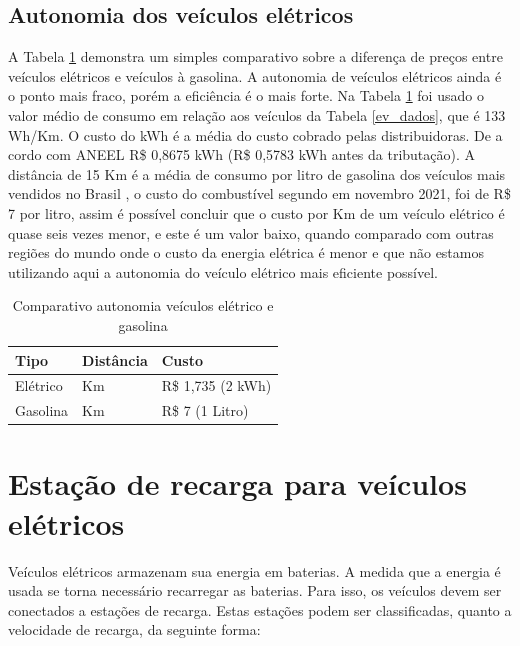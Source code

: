 \subsection{Autonomia dos veículos elétricos} \label{media_ev}

A Tabela \ref{ev_gas} demonstra um simples comparativo sobre a diferença de preços entre veículos elétricos e veículos à gasolina. A autonomia de veículos elétricos ainda é o ponto mais fraco, porém a eficiência é o mais forte. Na Tabela \ref{ev_gas} foi usado o valor médio de consumo em relação aos veículos da Tabela \ref{ev_dados}, que é 133 Wh/Km. O custo do kWh é a média do custo cobrado pelas distribuidoras. De a cordo com ANEEL \cite{ANEEL_TARIFA} R\$ 0,8675 kWh (R\$ 0,5783 kWh antes da tributação). A distância de 15 Km é a média de consumo por litro de gasolina dos veículos mais vendidos no Brasil \cite{uol_veiculos_consumo}, o custo do combustível segundo \cite{agenciabrasil} em novembro 2021, foi de R\$ 7 por litro, assim é possível concluir que o custo por Km de um veículo elétrico é quase seis vezes menor, e este é um valor baixo, quando comparado com outras regiões do mundo onde o custo da energia elétrica é menor e que não estamos utilizando aqui a autonomia do veículo elétrico mais eficiente possível.

\begin{table}[htbp]
    \caption{Comparativo autonomia veículos elétrico e gasolina}
        \begin{center}
            \begin{tabular}{ >{\centering\arraybackslash} m{3cm} >{\centering\arraybackslash} m{4cm} >{\centering\arraybackslash} m{4cm}  }
                \hline
                Tipo & Distância &  Custo \\ \hline %
                Elétrico & 15 Km & R\$  1,735 (2 kWh) \\
                Gasolina & 15 Km & R\$ 7 (1 Litro)\\ \hline
            \end{tabular}
        \end{center}
    \label{ev_gas}
\end{table}

\section{Estação de recarga para veículos elétricos}

Veículos elétricos armazenam sua energia em baterias. A medida que a energia é usada se torna necessário recarregar as baterias. Para isso, os veículos devem ser conectados a estações de recarga. Estas estações podem ser classificadas, quanto a velocidade de recarga, da seguinte forma:


